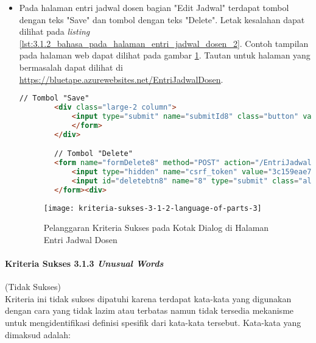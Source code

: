\begin{itemize}
    \item Pada halaman entri jadwal dosen bagian "Edit Jadwal" terdapat tombol dengan teks "Save" dan tombol dengan teks "Delete". Letak kesalahan dapat dilihat pada \textit{listing} \ref{lst:3.1.2_bahasa_pada_halaman_entri_jadwal_dosen_2}. Contoh tampilan pada halaman web dapat dilihat pada gambar \ref{fig:3.1.2_language_of_parts_3}. Tautan untuk halaman yang bermasalah dapat dilihat di \url{https://bluetape.azurewebsites.net/EntriJadwalDosen}.
    \begin{lstlisting}[frame=single, label={lst:3.1.2_bahasa_pada_halaman_entri_jadwal_dosen_2}, language=HTML, caption=Pelanggaran Kriteria Sukses 3.1.2 pada Kotak Dialog di Halaman Entri Jadwal Dosen]
        // Tombol "Save"
        <div class="large-2 column">
            <input type="submit" name="submitId8" class="button" value="Save">
            </form>
        </div>

        // Tombol "Delete"
        <form name="formDelete8" method="POST" action="/EntriJadwalDosen/delete/8">    
            <input type="hidden" name="csrf_token" value="3c159eae7bc953dd591b679c080ed066"/>
            <input id="deletebtn8" name="8" type="submit" class="alert button" value="Delete">
        </form><div>
    \end{lstlisting}
    
    \begin{figure}[H]
        \centering  
        \texttt{[image: kriteria-sukses-3-1-2-language-of-parts-3]}  
        \caption[Pelanggaran Kriteria Sukses 3.1.2 pada Kotak Dialog di Halaman Entri Jadwal Dosen]{Pelanggaran Kriteria Sukses pada Kotak Dialog di Halaman Entri Jadwal Dosen}
        \label{fig:3.1.2_language_of_parts_3}  
    \end{figure}
\end{itemize}

\paragraph{Kriteria Sukses 3.1.3 \textit{Unusual Words}}
\label{par:kepatuhan_bluetape_kriteria_sukses_3.1.3}
(Tidak Sukses)\\

Kriteria ini tidak sukses dipatuhi karena terdapat kata-kata yang digunakan dengan cara yang tidak lazim atau terbatas namun tidak tersedia mekanisme untuk mengidentifikasi definisi spesifik dari kata-kata tersebut. Kata-kata yang dimaksud adalah:

